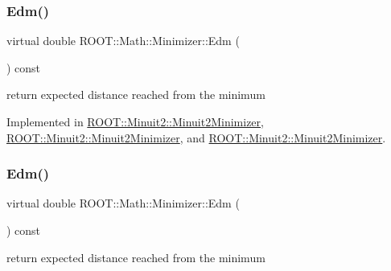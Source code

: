 \mbox{\label{classROOT_1_1Math_1_1Minimizer_a990c6935849a3fb31aedab1df6c26f28}} 
\subsubsection{\texorpdfstring{Edm()}{Edm()}\hspace{0.1cm}{\footnotesize\ttfamily [2/3]}}
{\footnotesize\ttfamily virtual double R\+O\+O\+T\+::\+Math\+::\+Minimizer\+::\+Edm (\begin{DoxyParamCaption}{ }\end{DoxyParamCaption}) const\hspace{0.3cm}{\ttfamily [pure virtual]}}



return expected distance reached from the minimum 



Implemented in \mbox{\hyperlink{classROOT_1_1Minuit2_1_1Minuit2Minimizer_ab9c1bfaaaf4c12acd1fd96ece3509269}{R\+O\+O\+T\+::\+Minuit2\+::\+Minuit2\+Minimizer}}, \mbox{\hyperlink{classROOT_1_1Minuit2_1_1Minuit2Minimizer_ab9c1bfaaaf4c12acd1fd96ece3509269}{R\+O\+O\+T\+::\+Minuit2\+::\+Minuit2\+Minimizer}}, and \mbox{\hyperlink{classROOT_1_1Minuit2_1_1Minuit2Minimizer_ab9c1bfaaaf4c12acd1fd96ece3509269}{R\+O\+O\+T\+::\+Minuit2\+::\+Minuit2\+Minimizer}}.

\mbox{\label{classROOT_1_1Math_1_1Minimizer_a990c6935849a3fb31aedab1df6c26f28}} 
\subsubsection{\texorpdfstring{Edm()}{Edm()}\hspace{0.1cm}{\footnotesize\ttfamily [3/3]}}
{\footnotesize\ttfamily virtual double R\+O\+O\+T\+::\+Math\+::\+Minimizer\+::\+Edm (\begin{DoxyParamCaption}{ }\end{DoxyParamCaption}) const\hspace{0.3cm}{\ttfamily [pure virtual]}}



return expected distance reached from the minimum 



